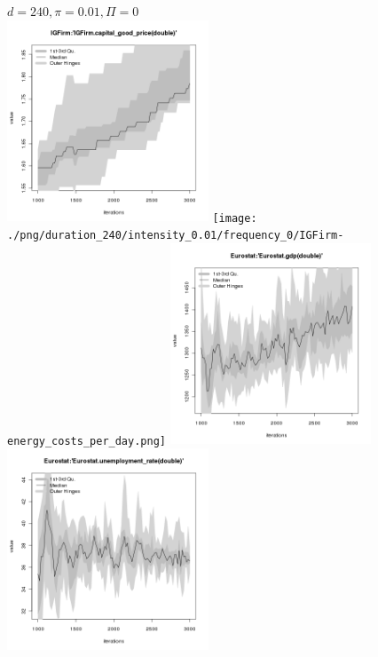 \begin{figure}[ht!]
\centering\leavevmode
\begin{minipage}{13cm}
\centering\leavevmode
{$d=240, \pi=0.01, \Pi=0$}\\
\includegraphics[width=6cm]{./png/duration_240/intensity_0.01/frequency_0/IGFirm-capital_good_price.png}
\texttt{[image: ./png/duration\_240/intensity\_0.01/frequency\_0/IGFirm-energy\_costs\_per\_day.png]}
\includegraphics[width=6cm]{./png/duration_240/intensity_0.01/frequency_0/Eurostat-gdp.png}
\includegraphics[width=6cm]{./png/duration_240/intensity_0.01/frequency_0/Eurostat-unemployment_rate.png}
\end{minipage}
\end{figure}

